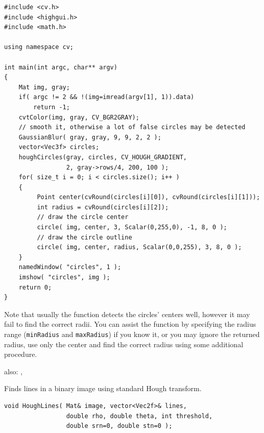 \begin{lstlisting}
#include <cv.h>
#include <highgui.h>
#include <math.h>

using namespace cv;

int main(int argc, char** argv)
{
    Mat img, gray;
    if( argc != 2 && !(img=imread(argv[1], 1)).data)
        return -1;
    cvtColor(img, gray, CV_BGR2GRAY);
    // smooth it, otherwise a lot of false circles may be detected
    GaussianBlur( gray, gray, 9, 9, 2, 2 );
    vector<Vec3f> circles;
    houghCircles(gray, circles, CV_HOUGH_GRADIENT,
                 2, gray->rows/4, 200, 100 );
    for( size_t i = 0; i < circles.size(); i++ )
    {
         Point center(cvRound(circles[i][0]), cvRound(circles[i][1]));
         int radius = cvRound(circles[i][2]);
         // draw the circle center
         circle( img, center, 3, Scalar(0,255,0), -1, 8, 0 );
         // draw the circle outline
         circle( img, center, radius, Scalar(0,0,255), 3, 8, 0 );
    }
    namedWindow( "circles", 1 );
    imshow( "circles", img );
    return 0;
}
\end{lstlisting}

Note that usually the function detects the circles' centers well, however it may fail to find the correct radii. You can assist the function by specifying the radius range (\texttt{minRadius} and \texttt{maxRadius}) if you know it, or you may ignore the returned radius, use only the center and find the correct radius using some additional procedure.

\see also: , 

\label{HoughLines}
Finds lines in a binary image using standard Hough transform.

\begin{lstlisting}
void HoughLines( Mat& image, vector<Vec2f>& lines,
                 double rho, double theta, int threshold,
                 double srn=0, double stn=0 );
\end{lstlisting}
\begin{description}
\end{description}

